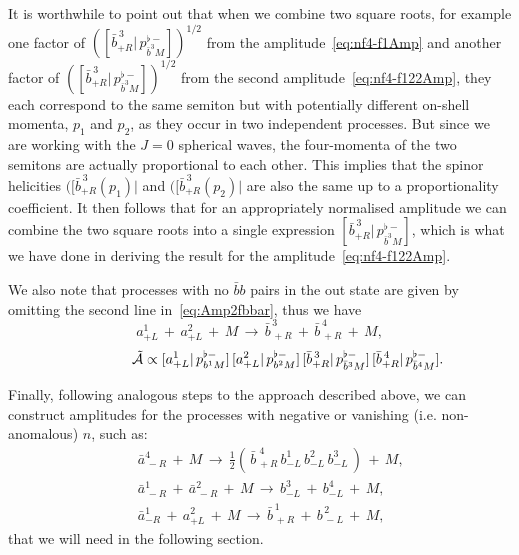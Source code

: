 \documentclass[a4paper,11pt]{article}
\begin{document}
It is worthwhile to point out that when we combine two square roots, for example one factor of $([\bar{b}_{+R}^{\,3} | \, p^{\flat -}_{\bar{b}^3 M} ])^{1/2}$
from the amplitude~\eqref{eq:nf4-f1Amp} and another factor of $([\bar{b}_{+R}^{\,3} | \, p^{\flat -}_{\bar{b}^3 M} ])^{1/2}$ from the second amplitude~\eqref{eq:nf4-f122Amp},
they each correspond to the same semiton but with potentially different on-shell momenta, $p_1$ and $p_2$, as they occur in two independent processes. But since we 
are working with the $J=0$ spherical waves, the four-momenta of the two semitons are actually proportional to each other. This implies that the spinor helicities
 $([\bar{b}_{+R}^{\,3} (p_1) |$ and $([\bar{b}_{+R}^{\,3} (p_2) |$ are also the same up to a proportionality coefficient. It then follows that for an appropriately normalised 
 amplitude we can combine the two square roots into a single expression $[\bar{b}_{+R}^{\,3} | \, p^{\flat -}_{\bar{b}^3 M} ]$, which is what we have done in deriving 
  the result for the amplitude~\eqref{eq:nf4-f122Amp}.


We also note that processes with no $\bar{b}b$ pairs in the out state are given by omitting the second line in~\eqref{eq:Amp2fbbar}, thus we have
\begin{equation}
\label{eq:prAmp2f}
 a_{+L}^1 \,+\,a_{+L}^2 \,+\,  M \,\to\, \bar{b}_{\,+R}^{\,3} \,+\, \bar{b}_{\,+R}^{\,4} \,+\,  M,
 \end{equation}
\begin{equation}
\label{eq:Amp2f}
\qquad \qquad
\tilde{\cal A}
 \propto
 [a_{+L}^1 | \, p^{\flat -}_{b^1 M} ]\,  [a_{+L}^2 | \, p^{\flat -}_{b^2 M} ]\,
 [\bar{b}_{+R}^{\,3} | \, p^{\flat -}_{\bar{b}^3 M} ]\,
    [\bar{b}_{+R}^{\,4} | \, p^{\flat -}_{\bar{b}^4 M} ].
 \end{equation} 

\medskip

Finally, following analogous steps to the approach described above, we can construct amplitudes for the processes 
with negative or vanishing (i.e. non-anomalous) $n$, such as:
\begin{eqnarray}
\label{eq:f1-minus}
&& \bar{a}_{\,-R}^4 \,+\, M \,\to\, \frac{1}{2} \left(
 \,\bar{b}_{\,+R}^{\,\,4} \,
  b_{-L}^1\,b_{-L}^2\,b_{-L}^3
   \,\right) \,+\,  M,\\
\label{eq:f2-minus}
&& \bar{a}_{\,-R}^1 \,+\,\bar{a}_{\,-R}^2 \,+\, M \,\to\,   b_{-L}^3\,+\,b_{-L}^4\,+\, M,\\
 \label{eq:f2-zero}
&& \bar{a}_{-R}^1 \,+\,  a_{+L}^2 \,+\, M \,\to\,  \bar{b}_{\,+R}^{\,1} \,+\, b_{\,-L}^{\,2} \,+\, M,
\end{eqnarray} 
that we will need in the following section.
\end{document}
